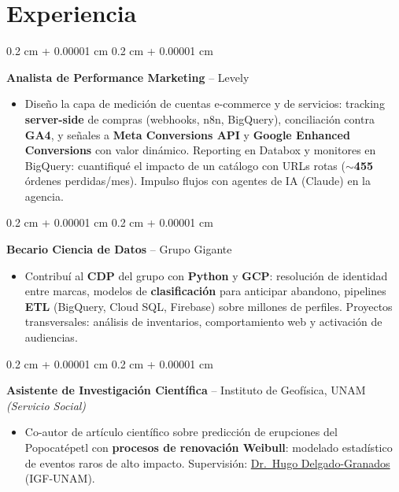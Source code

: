 \documentclass[10pt, letterpaper]{article}
\newenvironment{highlights}{
    \begin{itemize}[
        topsep=0.02 cm,
        parsep=0.05 cm,
        partopsep=0pt,
        itemsep=0pt,
        leftmargin=0.4 cm + 10pt
    ]
}{
    \end{itemize}
}
\newenvironment{onecolentry}{
    \begin{adjustwidth}{
        0.2 cm + 0.00001 cm
    }{
        0.2 cm + 0.00001 cm
    }
}{
    \end{adjustwidth}
}
\newcommand{\hl}[1]{\textcolor{primaryColor}{\textbf{#1}}}
\let\hrefWithoutArrow\href
\renewcommand{\href}[2]{\hrefWithoutArrow{#1}{\ifthenelse{\equal{#2}{}}{ }{#2 }\raisebox{.15ex}{\footnotesize \faExternalLink*}}}
\begin{document}
    \section{Experiencia}

        \begin{onecolentry}
            \textbf{Analista de Performance Marketing} -- Levely
            \begin{highlights}
                \item Diseño la capa de medición de cuentas e-commerce y de servicios: tracking \textbf{server-side} de compras (webhooks, n8n, BigQuery), conciliación contra \textbf{GA4}, y señales a \textbf{Meta Conversions API} y \textbf{Google Enhanced Conversions} con valor dinámico. Reporting en Databox y monitores en BigQuery: cuantifiqué el impacto de un catálogo con URLs rotas ($\sim$\hl{455} órdenes perdidas/mes). Impulso flujos con agentes de IA (Claude) en la agencia.
            \end{highlights}
            \end{onecolentry}

        \vspace{0.02 cm}

        \begin{onecolentry}
            \textbf{Becario Ciencia de Datos} -- Grupo Gigante
            \begin{highlights}
                \item Contribuí al \textbf{CDP} del grupo con \textbf{Python} y \textbf{GCP}: resolución de identidad entre marcas, modelos de \textbf{clasificación} para anticipar abandono, pipelines \textbf{ETL} (BigQuery, Cloud SQL, Firebase) sobre millones de perfiles. Proyectos transversales: análisis de inventarios, comportamiento web y activación de audiencias.
            \end{highlights}
            \end{onecolentry}

        \vspace{0.02 cm}

        \begin{onecolentry}
            \textbf{Asistente de Investigación Científica} -- Instituto de Geofísica, UNAM \textit{(Servicio Social)}
            \begin{highlights}
                \item Co-autor de artículo científico sobre predicción de erupciones del Popocatépetl con \textbf{procesos de renovación Weibull}: modelado estadístico de eventos raros de alto impacto. Supervisión: \hrefWithoutArrow{https://scholar.google.com/citations?user=lDD0DZQAAAAJ}{Dr.\ Hugo Delgado-Granados} (IGF-UNAM).
            \end{highlights}
            \end{onecolentry}
\end{document}
